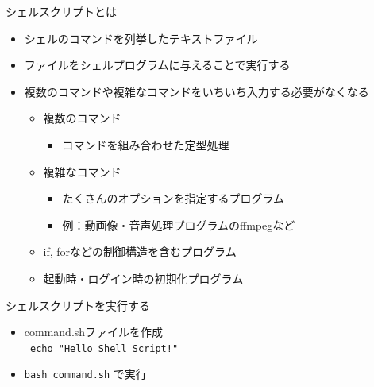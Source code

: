 \documentclass[12pt,aspectratio=169]{beamer}
\begin{document}
\begin{frame}{シェルスクリプトとは}
  \begin{itemize}
    \item シェルのコマンドを列挙したテキストファイル
    \item ファイルをシェルプログラムに与えることで実行する
    \item 複数のコマンドや複雑なコマンドをいちいち入力する必要がなくなる
      \begin{itemize}
        \item 複数のコマンド
          \begin{itemize}
            \item コマンドを組み合わせた定型処理
          \end{itemize}
        \item 複雑なコマンド
          \begin{itemize}
            \item たくさんのオプションを指定するプログラム
            \item 例：動画像・音声処理プログラムのffmpegなど
          \end{itemize}
        \item if, forなどの制御構造を含むプログラム
        \item 起動時・ログイン時の初期化プログラム
      \end{itemize}
  \end{itemize}

\end{frame}


\begin{frame}{シェルスクリプトを実行する}
  \begin{itemize}
    \item command.shファイルを作成 \\
      \texttt {
        echo "Hello Shell Script!"
      }
    \item \texttt{bash command.sh} で実行
  \end{itemize}


\end{frame}
\end{document}
